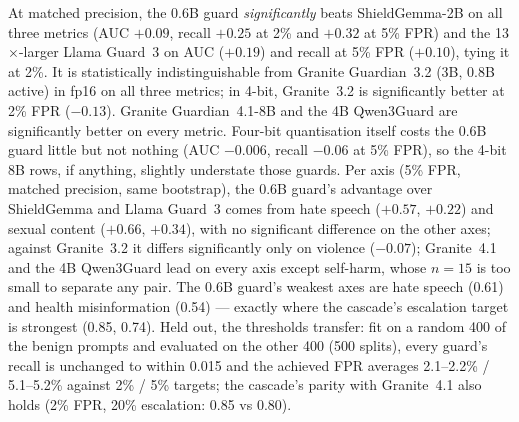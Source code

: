 \documentclass[11pt]{article}
\begin{document}
At matched precision, the 0.6B guard \emph{significantly} beats ShieldGemma-2B on all three metrics
(AUC $+0.09$, recall $+0.25$ at 2\% and $+0.32$ at 5\% FPR) and the 13$\times$-larger Llama Guard~3 on
AUC ($+0.19$) and recall at 5\% FPR ($+0.10$), tying it at 2\%. It is statistically indistinguishable
from Granite Guardian~3.2 (3B, 0.8B active) in fp16 on all three metrics; in 4-bit, Granite~3.2 is
significantly better at 2\% FPR ($-0.13$). Granite Guardian~4.1-8B and the 4B Qwen3Guard are
significantly better on every metric. Four-bit quantisation itself costs the 0.6B guard little but not
nothing (AUC $-0.006$, recall $-0.06$ at 5\% FPR), so the 4-bit 8B rows, if anything, slightly
understate those guards. Per axis (5\% FPR, matched precision, same
bootstrap), the 0.6B guard's advantage over ShieldGemma and Llama Guard~3 comes from hate speech ($+0.57$,
$+0.22$) and sexual content ($+0.66$, $+0.34$), with no significant difference on the other axes; against
Granite~3.2 it differs significantly only on violence ($-0.07$); Granite~4.1 and the 4B Qwen3Guard lead on
every axis except self-harm, whose $n{=}15$ is too small to separate any pair. The 0.6B guard's weakest axes
are hate speech (0.61) and health misinformation (0.54) --- exactly where the cascade's escalation target is
strongest (0.85, 0.74). Held out, the thresholds transfer: fit on a random 400 of the benign prompts and
evaluated on the other 400 (500 splits), every guard's recall is unchanged to within 0.015 and the achieved
FPR averages 2.1--2.2\% / 5.1--5.2\% against 2\% / 5\% targets; the cascade's parity with Granite~4.1 also holds
(2\% FPR, 20\% escalation: 0.85 vs 0.80).
\end{document}
